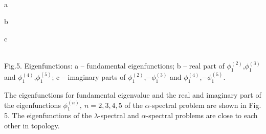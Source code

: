 \documentclass[a1paper,fontscale=0.6]{poster}
\begin{document}
\begin{poster}
{\begin{center}
\begin{minipage}{0.25\linewidth}
 \\
\end{minipage}

\begin{minipage}{0.051\linewidth}
\end{minipage}
\hfill
\begin{minipage}{0.25\linewidth}
\hspace{0.75em} a \\
\end{minipage}
\hfill
\begin{minipage}{0.25\linewidth} 
\hspace{1.5em} b \\
\end{minipage}
\hfill
\begin{minipage}{0.25\linewidth}
\hspace{2.75em} c \\
\end{minipage}
\\
\vspace{-1em}
\footnotesize{Fig.5. Eigenfunctions: a -- fundamental eigenfunctions; b -- real part of $\phi_1^{(2)}$,$\phi_1^{(3)}$ and $\phi_1^{(4)}$,$\phi_1^{(5)}$; c -- imaginary parts of $\phi_1^{(2)}$,$-\phi_1^{(3)}$ and $\phi_1^{(4)}$,$-\phi_1^{(5)}$.}
\end{center}

The eigenfunctions for fundamental eigenvalue and the real and imaginary part of the eigenfunctions $\phi^{(n)}_1, \ n = 2,3,4,5$ of the $\alpha$-spectral problem  are shown in Fig. 5. The eigenfunctions of the $\lambda$-spectral and $\alpha$-spectral problems are close to each other in topology.

}
\end{poster}
\end{document}
